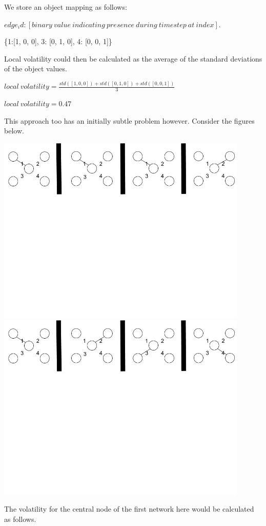 We store an object mapping as follows:

$edge_id: [binary\ value\ indicating\ presence\ during\ timestep\ at\ index].$

\begin{center}
\{1:[1, 0, 0], 3: [0, 1, 0], 4: [0, 0, 1]\}
\end{center}
Local volatility could then be calculated as the average of the standard deviations of the object values.
\begin{center}
$local\ volatility = \frac{std([1,0,0]) + std([0,1,0]) + std([0,0,1])}{3}$

$local\ volatility = 0.47$
\end{center}

This approach too has an initially subtle problem however. Consider the figures below.
\begin{center}
\includegraphics[trim={0 10cm 0 -1cm}, width=120mm]{./Figures/volatilityLastProblem1.jpg}
\includegraphics[trim={0 10cm 0 -1cm}, width=120mm]{./Figures/volatilityLastProblem2.jpg}
\end{center}
The volatility for the central node of the first network here would be calculated as follows.

